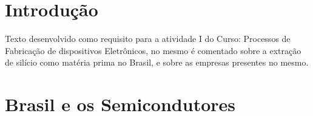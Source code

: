 
\section{Introdução}

Texto desenvolvido como requisito para a atividade I do Curso: Processos de Fabricação de dispositivos Eletrônicos, no mesmo é comentado sobre a extração de silício como matéria prima no Brasil, e sobre as empresas presentes no mesmo.

\section{Brasil e os Semicondutores}

